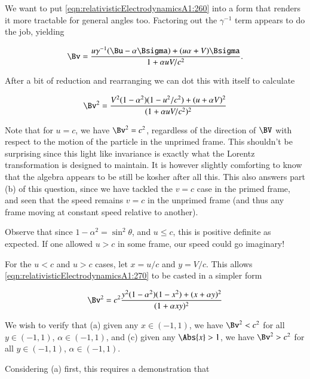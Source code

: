 We want to put \ref{eqn:relativisticElectrodynamicsA1:260} into a form that renders it more tractable for general angles too.  Factoring out the $\gamma^{-1}$ term appears to do the job, yielding

\begin{equation}\label{eqn:relativisticElectrodynamicsA1:260c}
\Bv = \frac{u \gamma^{-1} (\Bu -\alpha \Bsigma) + (u \alpha + V) \Bsigma}{ 1 + \alpha u V/c^2 }.
\end{equation}

After a bit of reduction and rearranging we can dot this with itself to calculate

\begin{equation}\label{eqn:relativisticElectrodynamicsA1:270}
\Bv^2 = \frac{V^2(1 - \alpha^2)(1 - u^2/c^2) + (u + \alpha V)^2}{ (1 + \alpha u V/c^2)^2 }
\end{equation}

Note that for $u = c$, we have $\Bv^2 = c^2$, regardless of the direction of $\BV$ with respect to the motion of the particle in the unprimed frame.  This shouldn't be surprising since this light like invariance is exactly what the Lorentz transformation is designed to maintain.  It is however slightly comforting to know that the algebra appears to be still be kosher after all this.  This also answers part (b) of this question, since we have tackled the $v = c$ case in the primed frame, and seen that the speed remains $v = c$ in the unprimed frame (and thus any frame moving at constant speed relative to another).

Observe that since $1 - \alpha^2 = \sin^2\theta$, and $u \le c$, this is positive definite as expected.  If one allowed $u > c$ in some frame, our speed could go imaginary!

For the $u < c$ and $u > c$ cases, let $x = u/c$ and $y = V/c$.  This allows \ref{eqn:relativisticElectrodynamicsA1:270} to be casted in a simpler form

\begin{equation}\label{eqn:relativisticElectrodynamicsA1:270e}
\Bv^2 = c^2 \frac{y^2 (1 - \alpha^2)(1 - x^2) + (x + \alpha y)^2}{ (1 + \alpha x y)^2 }
\end{equation}

We wish to verify that (a) given any $x \in (-1,1)$, we have $\Bv^2 < c^2$ for all $y \in (-1,1)$, $\alpha \in (-1,1)$, and (c) given any $\Abs{x} > 1$, we have $\Bv^2 > c^2$ for all $y \in (-1,1)$, $\alpha \in (-1,1)$.

Considering (a) first, this requires a demonstration that 


